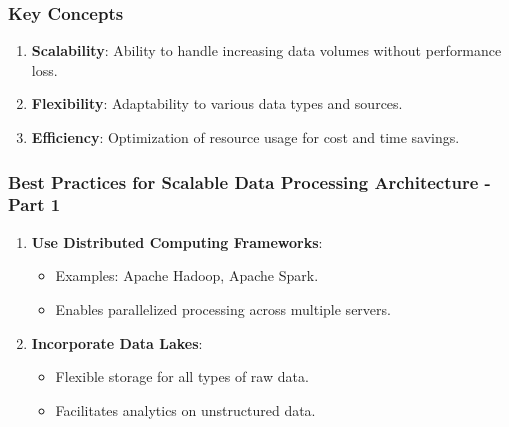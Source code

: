 \documentclass[aspectratio=169]{beamer}
\begin{document}
\begin{frame}
    \frametitle{Key Concepts}
    \begin{enumerate}
        \item \textbf{Scalability}: Ability to handle increasing data volumes without performance loss.
        \item \textbf{Flexibility}: Adaptability to various data types and sources.
        \item \textbf{Efficiency}: Optimization of resource usage for cost and time savings.
    \end{enumerate}
\end{frame}

\begin{frame}
    \frametitle{Best Practices for Scalable Data Processing Architecture - Part 1}
    \begin{enumerate}
        \item \textbf{Use Distributed Computing Frameworks}:
            \begin{itemize}
                \item Examples: Apache Hadoop, Apache Spark.
                \item Enables parallelized processing across multiple servers.
            \end{itemize}
        \item \textbf{Incorporate Data Lakes}:
            \begin{itemize}
                \item Flexible storage for all types of raw data.
                \item Facilitates analytics on unstructured data.
            \end{itemize}
    \end{enumerate}
\end{frame}
\end{document}
